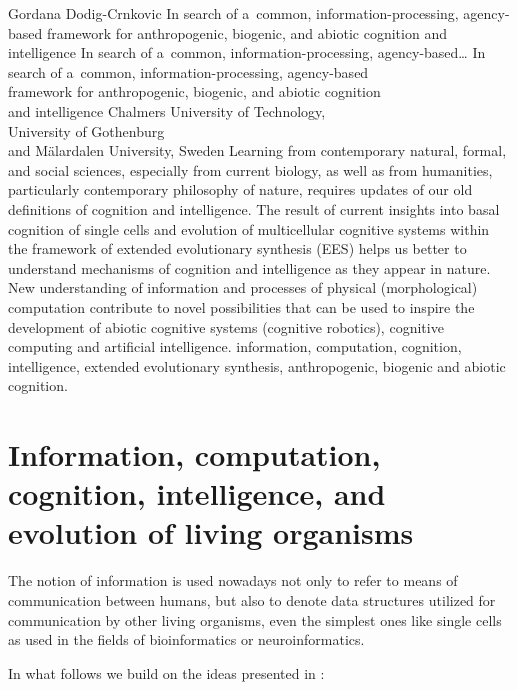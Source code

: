 \begin{artengenv}{Gordana Dodig-Crnkovic}
	{\label{gordana_start}In search of a~common, information-processing, agency-based framework for anthropogenic, biogenic, and abiotic cognition and intelligence}
	{In search of a~common, information-processing, agency-based\ldots}
	{In search of a~common, information-processing, agency-based\\framework for anthropogenic, biogenic, and abiotic cognition\\and intelligence}
	{Chalmers University of Technology,\\University of Gothenburg\\and Mälardalen University, Sweden}
	{Learning from contemporary natural, formal, and social sciences, especially from current biology, as well as from humanities, particularly contemporary philosophy of nature, requires updates of our old definitions of cognition and intelligence. The result of current insights into basal cognition of single cells and evolution of multicellular cognitive systems within the framework of extended evolutionary synthesis (EES) helps us better to understand mechanisms of cognition and intelligence as they appear in nature. New understanding of information and processes of physical (morphological) computation contribute to novel possibilities that can be used to inspire the development of abiotic cognitive systems (cognitive robotics), cognitive computing and artificial intelligence.
	}
	{information, computation, cognition, intelligence, extended evolutionary synthesis, anthropogenic, biogenic and abiotic cognition.}


\section*{Information, computation, cognition, intelligence, and evolution of living organisms}
\lettrine[loversize=0.13,lines=2,lraise=-0.03,nindent=0em,findent=0.2pt]%
{T}{}he notion of information is used nowadays not only to refer to means of communication between humans, but also to denote data structures utilized for communication by other living organisms, even the simplest ones like single cells as used in the fields of bioinformatics or neuroinformatics.

In what follows we build on the ideas presented in
\parencite[][]{dodig-crnkovic_computational_2017}:%


\end{artengenv}
